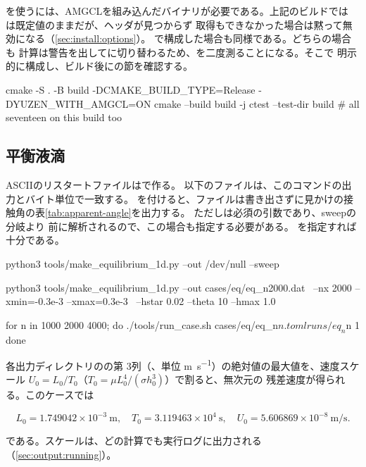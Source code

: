 を使うには、AMGCLを組み込んだバイナリが必要である。上記のビルドでは
は既定値のままだが、ヘッダが見つからず
取得もできなかった場合は黙って無効になる（\cref{sec:install:options}）。
で構成した場合も同様である。どちらの場合も
計算は警告を出してに切り替わるため、を二度測ることになる。そこで
明示的に構成し、ビルド後にの節を確認する。

\begin{shell}
cmake -S . -B build -DCMAKE_BUILD_TYPE=Release -DYUZEN_WITH_AMGCL=ON
cmake --build build -j
ctest --test-dir build                        # all seventeen on this build too
\end{shell}

\subsection{平衡液滴}

ASCIIのリスタートファイルはで作る。
以下のファイルは、このコマンドの出力とバイト単位で一致する。
を付けると、ファイルは書き出さずに見かけの接触角の表\cref{tab:apparent-angle}を出力する。
ただしは必須の引数であり、sweepの分岐より
前に解析されるので、この場合も指定する必要がある。
を指定すれば十分である。

\begin{shell}
python3 tools/make_equilibrium_1d.py --out /dev/null --sweep

python3 tools/make_equilibrium_1d.py --out cases/eq/eq_n2000.dat \
        --nx 2000 --xmin=-0.3e-3 --xmax=0.3e-3 \
        --hstar 0.02 --theta 10 --hmax 1.0

for n in 1000 2000 4000; do
  ./tools/run_case.sh cases/eq/eq_n$n.toml runs/eq_n$n 1
done
\end{shell}

各出力ディレクトリのの第 3列（、単位
\si{\metre\per\second}）の絶対値の最大値を、速度スケール
$U_0 = L_0/T_0$（$T_0 = \mu L_0^{4}/(\sigma h_0^{3})$）で割ると、無次元の
残差速度が得られる。このケースでは

\[
  L_0 = 1.749042\times10^{-3}~\si{\metre}, \quad
  T_0 = 3.119463\times10^{4}~\si{\second}, \quad
  U_0 = 5.606869\times10^{-8}~\si{\metre\per\second} .
\]

である。スケールは、どの計算でも実行ログに出力される
（\cref{sec:output:running}）。

